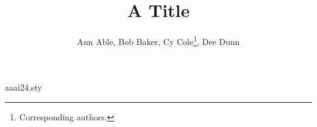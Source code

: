 \begin{filecontents*}[overwrite]{aaai24.sty}
\def\maketitle{\par\begingroup\def\thefootnote{\fnsymbol{footnote}}\twocolumn[\@maketitle]\@thanks\endgroup
  \setcounter{footnote}{0}\let\maketitle\relax\let\@maketitle\relax
  \gdef\@thanks{}\gdef\@author{}\gdef\@title{}\let\thanks\relax}
\def\@maketitle{\newcounter{eqfn}\setcounter{eqfn}{0}%
  \vbox{\let\footnote\thanks\relax\setcounter{footnote}{0}%
    \def\equalcontrib{\ifnum\value{eqfn}=0 \footnote{These authors contributed equally.}%
      \setcounter{eqfn}{\value{footnote}}\else\footnotemark[\value{eqfn}]\fi}%
    \hsize\textwidth\centering{\LARGE\bf\@title\par}\vskip 1em{\Large\bf\@author\par}}}
\end{filecontents*}
\documentclass{article}
\usepackage{aaai24}
\title{A Title}
\author{Ann Able\equalcontrib, Bob Baker\equalcontrib, Cy Cole\thanks{Corresponding authors.}, Dee Dunn\footnotemark[2]}

\maketitle
Body.

